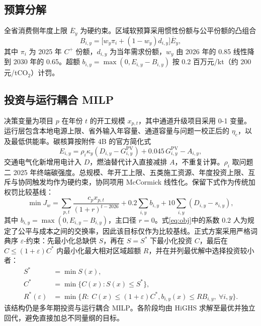 \documentclass[UTF8,a4paper,zihao=-4,fontset=fandol]{ctexart}
\begin{document}
\subsection{预算分解}

全省消费侧年度上限 $\overline E_y$ 为硬约束。区域软预算采用惯性份额与公平份额的凸组合\cite{Raupach2014sharing,Zhou2016carbon,Wang2013regional}
\begin{equation}
B_{i,y}=\bigl[w_y\pi_i+(1-w_y)d_{i,y}\bigr]\overline E_y,
\label{eq:budget}
\end{equation}
其中 $\pi_i$ 为 2025 年 $C^+$ 份额，$d_{i,y}$ 为当年需求份额，$w_y$ 由 2026 年的 0.85 线性降到 2030 年的 0.65。超额 $b_{i,y}=\max(0,E_{i,y}-B_{i,y})$ 按 0.2 百万元/kt（约 200 元/tCO$_2$）计罚。

\subsection{投资与运行耦合 MILP}

决策变量为项目 $p$ 在年份 $t$ 的开工规模 $x_{p,t}$，其中通道升级项目采用 0-1 变量。运行层包含本地电源上限、省外输入年容量、通道容量与问题一校正后的 $\eta_e$，以及最低供能率。碳核算按附件 4B 的官方简化式
\begin{equation}
E_{i,y}=\rho_i\kappa_y(D_{i,y}-G^{\mathrm{PV}}_{i,y})+0.045\,G^{\mathrm{PV}}_{i,y}-A_{i,y},
\label{eq:E}
\end{equation}
交通电气化新增用电计入 $D$，燃油替代计入直接减排 $A$，不重复计算。$\rho_i$ 取问题二 2025 年终端碳强度。总规模、年开工上限、五类施工资源、年度投资上限、互斥与协同触发均作为硬约束，协同项用 McCormick 线性化。保留下式作为传统加权罚比较基线：
\begin{equation}
\min J_w=\sum_{p,t}\frac{c_p x_{p,t}}{(1+r)^{t-2026}}
+0.2\sum_{i,y}b_{i,y}
+10\sum_{i,y}(D_{i,y}-s_{i,y}),
\label{eq:obj}
\end{equation}
其中 $b_{i,y}=\max(0,E_{i,y}-B_{i,y})$，主口径 $r=0$。式\eqref{eq:obj}中的系数 0.2 人为规定了公平与成本之间的交换率，因此该目标仅作为比较基线。正式方案采用严格词典序 $\varepsilon$-约束：先最小化总缺供 $S$，再在 $S=S^*$ 下最小化投资 $C$，最后在 $C\le(1+\varepsilon)C^*$ 内最小化最大相对区域超额 $R$，并在并列最优解中选择投资较小者：
\begin{equation}
\begin{aligned}
S^*&=\min S(x),\\
C^*&=\min\{C(x):S(x)\le S^*\},\\
R^*(\varepsilon)&=\min\bigl\{R:\ C(x)\le(1+\varepsilon)C^*,
b_{i,y}(x)\le R B_{i,y},\ \forall i,y\bigr\}.
\end{aligned}
\label{eq:epsilon}
\end{equation}
该结构仍是多年期投资与运行耦合 MILP\cite{Koltsaklis2018generation}。各阶段均由 HiGHS 求解至最优并独立回代，避免直接加总不同量纲的目标。
\end{document}
